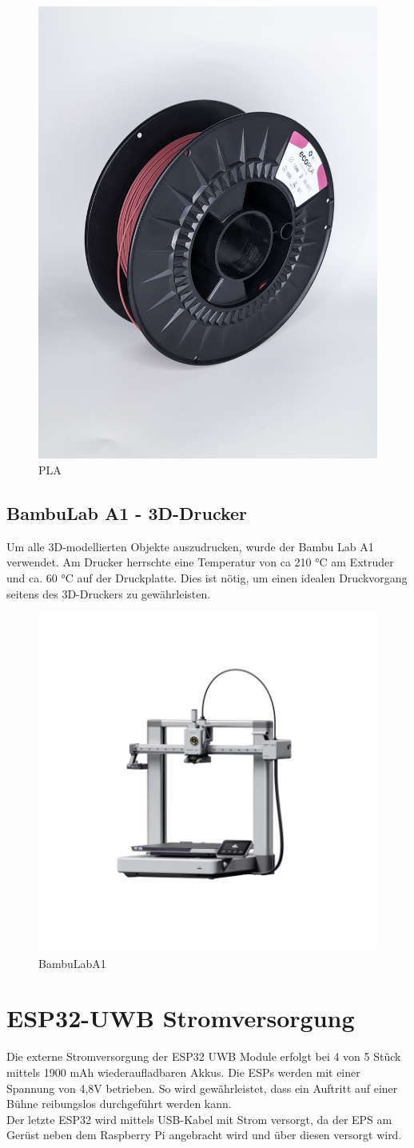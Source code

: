 \begin{figure}[H]
	\centering
	\includegraphics[width=0.4\linewidth]{images/PLA.jpg}
	\caption[PLA]{PLA}
	\label{fig:PLA} 
\end{figure}

\newpage
\subsection{BambuLab A1 - 3D-Drucker}
Um alle 3D-modellierten Objekte auszudrucken, wurde der Bambu Lab A1 verwendet. Am Drucker herrschte eine Temperatur von ca 210 °C am Extruder und ca. 60 °C auf der Druckplatte. Dies ist nötig, um einen idealen Druckvorgang seitens des 3D-Druckers zu gewährleisten.

\begin{figure}[H]
	\centering
	\includegraphics[width=0.6\linewidth]{images/BambuLabA1.jpg}
	\caption[BambuLabA1]{BambuLabA1}
	\label{fig: BambuLabA1}
\end{figure}

\newpage
\section{ESP32-UWB Stromversorgung}
Die externe Stromversorgung der ESP32 UWB Module erfolgt bei 4 von 5 Stück mittels 1900 mAh wiederaufladbaren Akkus. Die ESPs werden mit einer Spannung von 4,8V betrieben. So wird gewährleistet, dass ein Auftritt auf einer Bühne reibungslos durchgeführt werden kann.\\
Der letzte ESP32 wird mittels USB-Kabel mit Strom versorgt, da der EPS am Gerüst neben dem Raspberry Pi angebracht wird und über diesen versorgt wird.\\


